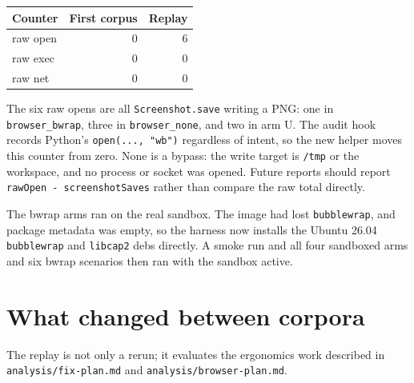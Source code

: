 \documentclass[11pt]{article}
\newcommand{\code}[1]{\texttt{#1}}
\begin{document}
\begin{table}[h]
\centering
\small
\begin{tabular}{@{}lrr@{}}
\toprule
Counter & First corpus & Replay \\
\midrule
raw open & 0 & 6 \\
raw exec & 0 & 0 \\
raw net & 0 & 0 \\
\bottomrule
\end{tabular}
\end{table}

The six raw opens are all \code{Screenshot.save} writing a PNG:
one in \code{browser\_bwrap}, three in \code{browser\_none}, and two in arm U.
The audit hook records Python's \code{open(..., "wb")} regardless of intent, so
the new helper moves this counter from zero. None is a bypass: the write target
is \code{/tmp} or the workspace, and no process or socket was opened. Future
reports should report \code{rawOpen - screenshotSaves} rather than compare the
raw total directly.

The bwrap arms ran on the real sandbox. The image had lost \code{bubblewrap},
and package metadata was empty, so the harness now installs the Ubuntu 26.04
\code{bubblewrap} and \code{libcap2} debs directly. A smoke run and all four
sandboxed arms and six bwrap scenarios then ran with the sandbox active.

\section{What changed between corpora}

The replay is not only a rerun; it evaluates the ergonomics work described in
\code{analysis/fix-plan.md} and \code{analysis/browser-plan.md}.
\end{document}
